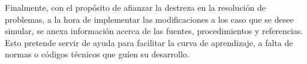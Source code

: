 Finalmente, con el propósito de afianzar la destreza en la resolución de
problemas, a la hora de implementar las modificaciones a los caso que se
desee simular, se anexa información acerca de las fuentes,
procedimientos y referencias. Esto pretende servir de ayuda para
facilitar la curva de aprendizaje, a falta de normas o códigos técnicos
que guíen su desarrollo.
